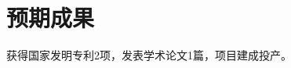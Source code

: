 \documentclass[a4paper,12pt]{report}
\begin{document}
\section{预期成果}
获得国家发明专利2项，发表学术论文1篇，项目建成投产。









\renewcommand\bibname{参考文献}




%
\end{document}
